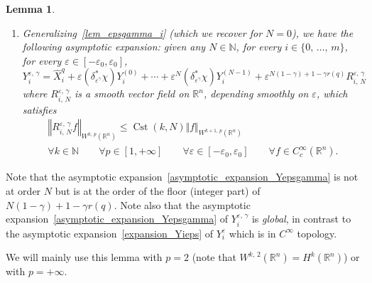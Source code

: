 \documentclass[10pt]{amsart}
\newtheorem{lemm}[theo]{Lemma}\newtheorem{prop}[theo]{Proposition}\newtheorem{coro}[theo]{Corollary}\newtheorem{conj}[theo]{Conjecture}
\theoremstyle{definition}\newtheorem{defi}[theo]{Definition}\newtheorem{rema}[theo]{Remark}\newtheorem{exam}[theo]{Example}\newtheorem{exem}[theo]{Example}\newtheorem{nota}[theo]{Notation}
\newcommand*\R{\mathbb{R}}
\newcommand*\N{\mathbb{N}}
\DeclareMathOperator{\Cst}{Cst}
\DeclareMathOperator{\Lie}{Lie}
\renewcommand{\leq}{\leqslant}
\let\oldforall\forall
\renewcommand*{\forall}{\mathrel{\oldforall}}
\begin{document}
\begin{lemm}
\begin{enumerate}
In particular, if $\varepsilon_0$ is small enough then $\Lie(Y_1^{\varepsilon,\,\gamma},\,\ldots,\,Y_m^{\varepsilon,\,\gamma})=\R^n$ for every $\varepsilon\in[-\varepsilon_0,\varepsilon_0]$, with a uniform degree of nonholonomy $r$.

\item\label{lem_epsgamma_iv}
Generalizing~\eqref{lem_epsgamma_i} (which we recover for $N=0$), we have the following asymptotic expansion: given any $N\in\N$, for every $i\in\{0,\,\ldots,\,m\}$, for every $\varepsilon\in[-\varepsilon_0,\varepsilon_0]$,
\begin{equation}\label{asymptotic_expansion_Yepsgamma}
Y_i^{\varepsilon,\,\gamma} = \widehat{X}_i^q + \varepsilon \left(\delta_{\varepsilon^\gamma}^*\chi\right) Y_i^{(0)} + \cdots + \varepsilon^N \left(\delta_{\varepsilon^\gamma}^*\chi\right) Y_i^{(N-1)} + \varepsilon^{N(1-\gamma)+1-\gamma r(q)} R_{i,\,N}^{\varepsilon,\,\gamma}
\end{equation}
where $R_{i,\,N}^{\varepsilon,\,\gamma}$ is a smooth vector field on $\R^n$, depending smoothly on $\varepsilon$, which satisfies
\begin{multline*}
\left\Vert R_{i,\,N}^{\varepsilon,\,\gamma} f \right\Vert_{W^{k,\,p}(\R^n)} \leq \Cst(k,N) \Vert f\Vert_{W^{k+1,\,p}(\R^n)} \\
\forall k\in\N\qquad\forall p\in[1,+\infty]\qquad \forall \varepsilon\in[-\varepsilon_0,\varepsilon_0]\qquad \forall f\in C_c^\infty(\R^n).
\end{multline*}
\end{enumerate}
\end{lemm}


Note that the asymptotic expansion~\eqref{asymptotic_expansion_Yepsgamma} is not at order $N$ but is at the order of the floor (integer part) of $N(1-\gamma)+1-\gamma r(q)$. Note also that the asymptotic expansion~\eqref{asymptotic_expansion_Yepsgamma} of $Y_i^{\varepsilon,\,\gamma}$ is \emph{global}, in contrast to the asymptotic expansion~\eqref{expansion_Yieps} of $Y_i^\varepsilon$ which is in $C^\infty$ topology.

We will mainly use this lemma with $p=2$ (note that $W^{k,\,2}(\R^n)=H^k(\R^n)$) or with $p=+\infty$.
\end{document}
